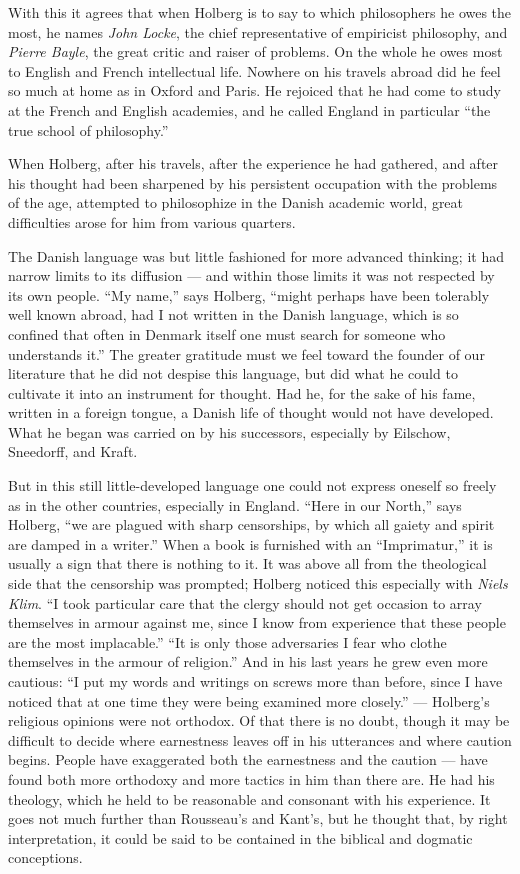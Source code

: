 \documentclass[12pt,a4paper]{book}
\newcommand{\opage}[1]{\marginnote{\footnotesize\textit{[#1]}}}
\begin{document}
With this it agrees that when Holberg is to say to which philosophers he owes the
most, he names \emph{John Locke}, the chief representative of empiricist philosophy, and
\emph{Pierre Bayle}, the great critic and raiser of problems. On the whole he owes most
to English and French intellectual life. Nowhere on his travels abroad did he
feel so much at home as in Oxford and Paris. He rejoiced that he had come to
study at the French and English academies, and he called England in particular
``the true school of philosophy.''

When Holberg, after his travels, after the experience he \opage{6}had gathered, and after
his thought had been sharpened by his persistent occupation with the problems of
the age, attempted to philosophize in the Danish academic world, great
difficulties arose for him from various quarters.

The Danish language was but little fashioned for more advanced thinking; it had
narrow limits to its diffusion --- and within those limits it was not respected
by its own people. ``My name,'' says Holberg, ``might perhaps have been tolerably
well known abroad, had I not written in the Danish language, which is so confined
that often in Denmark itself one must search for someone who understands it.''
The greater gratitude must we feel toward the founder of our literature that he
did not despise this language, but did what he could to cultivate it into an
instrument for thought. Had he, for the sake of his fame, written in a foreign
tongue, a Danish life of thought would not have developed. What he began was
carried on by his successors, especially by Eilschow, Sneedorff, and Kraft.

But in this still little-developed language one could not express oneself so
freely as in the other countries, especially in England. ``Here in our North,''
says Holberg, ``we are plagued with sharp censorships, by which all gaiety and
spirit are damped in a writer.'' When a book is furnished with an ``Imprimatur,''
it is usually a sign that there is nothing to it. It was above all from the
theological side that the censorship was prompted; Holberg noticed this
especially with \emph{Niels Klim}. ``I took particular care that the clergy
should not get occasion to array themselves in armour against me, since I know
from experience that these people are the most implacable.'' ``It is only those
adversaries I fear who clothe themselves in the armour of religion.'' And in his
last years he grew even more cautious: ``I put my words and writings on screws
more than before, since I have noticed that at one time they were being examined
more closely.'' --- Holberg's religious opinions were not orthodox. Of that there
is no doubt, though it may be difficult to decide where earnestness leaves off in
his utterances and where caution begins. People have exaggerated both the
earnestness and the \opage{7}caution --- have found both more orthodoxy and more tactics
in him than there are. He had his theology, which he held to be reasonable and
consonant with his experience. It goes not much further than Rousseau's and
Kant's, but he thought that, by right interpretation, it could be said to be
contained in the biblical and dogmatic conceptions.
\end{document}
